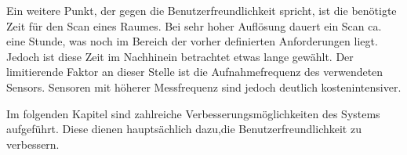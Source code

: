 Ein weitere Punkt, der gegen die Benutzerfreundlichkeit spricht, ist die benötigte Zeit für den Scan eines Raumes. Bei sehr hoher Auflösung dauert ein Scan ca. eine Stunde, was noch im Bereich der vorher definierten Anforderungen liegt. Jedoch ist diese Zeit im Nachhinein betrachtet etwas lange gewählt. Der limitierende Faktor an dieser Stelle ist die Aufnahmefrequenz des verwendeten Sensors. Sensoren mit höherer Messfrequenz sind jedoch deutlich kostenintensiver.

Im folgenden Kapitel sind zahlreiche Verbesserungsmöglichkeiten des Systems aufgeführt. Diese dienen hauptsächlich dazu,die Benutzerfreundlichkeit zu verbessern.

